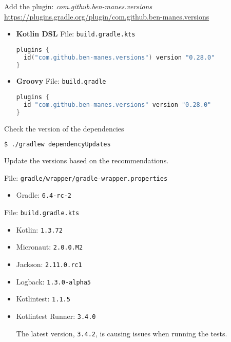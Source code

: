 \begin{enumerate}
Add the plugin: \textit{com.github.ben-manes.versions}
\newline
{\footnotesize \url{https://plugins.gradle.org/plugin/com.github.ben-manes.versions}}

\begin{itemize}

\item[] \textbf{Kotlin DSL}
\newline
File: \texttt{build.gradle.kts}

\begin{lstlisting}[language=Kotlin]
plugins {
  id("com.github.ben-manes.versions") version "0.28.0"
}
\end{lstlisting}

\item[] \textbf{Groovy}
\newline
File: \texttt{build.gradle}

\begin{lstlisting}[language=Groovy]
plugins {
  id "com.github.ben-manes.versions" version "0.28.0"
}
\end{lstlisting}

\end{itemize}

Check the version of the dependencies

\begin{lstlisting}[language=bash]
$ ./gradlew dependencyUpdates
\end{lstlisting}

Update the versions based on the recommendations.

File: \texttt{gradle/wrapper/gradle-wrapper.properties}
\begin{itemize}
\item Gradle: \texttt{6.4-rc-2}
\end{itemize}

File: \texttt{build.gradle.kts}
\begin{itemize}
\item Kotlin: \texttt{1.3.72}
\item Micronaut: \texttt{2.0.0.M2}
\item Jackson: \texttt{2.11.0.rc1}
\item Logback: \texttt{1.3.0-alpha5}
\item Kotlintest: \texttt{1.1.5}
\item Kotlintest Runner: \texttt{3.4.0}

The latest version, \texttt{3.4.2}, is causing issues when running the tests.


\end{itemize}
\end{enumerate}
